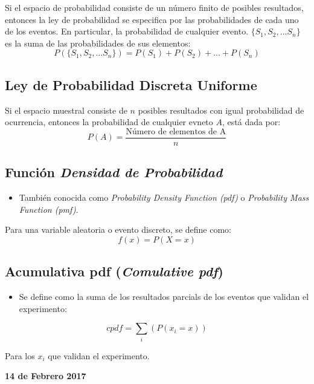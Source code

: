 \documentclass[]{book}
\providecommand{\tightlist}{%
  \setlength{\itemsep}{0pt}\setlength{\parskip}{0pt}}
\begin{document}
Si el espacio de probabilidad consiste de un número finito de posibles
resultados, entonces la ley de probabilidad se especifica por las
probabilidades de cada uno de los eventos. En particular, la
probabilidad de cualquier evento. \(\{S_1,S_2,...S_n\}\) es la suma de
las probabilidades de sus elementos:
\[P(\{S_1,S_2,...S_n\}) = P(S_1)+P(S_2)+...+P(S_n)\]

\subsection{Ley de Probabilidad Discreta
Uniforme}\label{ley-de-probabilidad-discreta-uniforme-1}

Si el espacio muestral consiste de \(n\) posibles resultados con igual
probabilidad de ocurrencia, entonces la probabilidad de cualquier evneto
\(A\), está dada por:
\[P(A)= \frac{\text{Número de elementos de A}}{n}\]

\subsection{\texorpdfstring{Función \emph{Densidad de
Probabilidad}}{Función Densidad de Probabilidad}}\label{funcion-densidad-de-probabilidad-1}

\begin{itemize}
\tightlist
\item
  También conocida como \emph{Probability Density Function (pdf)} o
  \emph{Probability Mass Function (pmf)}.
\end{itemize}

Para una variable aleatoria o evento discreto, se define como:
\[f(x) = P(X=x)\]

\subsection{\texorpdfstring{Acumulativa pdf (\emph{Comulative
pdf})}{Acumulativa pdf (Comulative pdf)}}\label{acumulativa-pdf-comulative-pdf-1}

\begin{itemize}
\tightlist
\item
  Se define como la suma de los resultados parcials de los eventos que
  validan el experimento:
\end{itemize}

\[cpdf = \sum_{i}(P(x_i=x))\]

Para los \(x_i\) que validan el experimento.

\textbf{14 de Febrero 2017}
\end{document}

